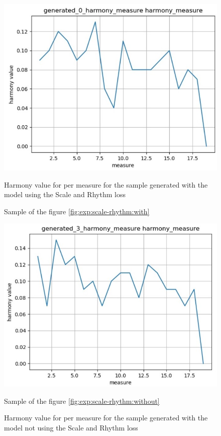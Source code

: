 \documentclass[12pt]{report}
\begin{document}
\begin{figure}[htbp]
    \begin{minipage}{0.5\textwidth}
        \begin{center}
            \includegraphics[width=\textwidth]{images/experiences/scale-rhythm-rnn/generated-harmony-with-scale-rhythm.jpg}
            \caption{Harmony value for per measure for the sample generated with the model using the Scale and Rhythm loss}
            Sample of the figure \ref{fig:exp:scale-rhythm:with}
            \label{fig:exp:scale-rhythm:harmony-generated:with}
        \end{center}
    \end{minipage} \hfill
    \begin{minipage}{0.5 \textwidth}
        \begin{center}
            \includegraphics[width=\textwidth]{images/experiences/scale-rhythm-rnn/generated-harmony-without-scale-rhythm.jpg}
            \caption{Harmony value for per measure for the sample generated with the model not using the Scale and Rhythm loss}
            Sample of the figure \ref{fig:exp:scale-rhythm:without}
            \label{fig:exp:scale-rhythm:harmony-generated:without}
        \end{center}
    \end{minipage}
\end{figure}
\end{document}
